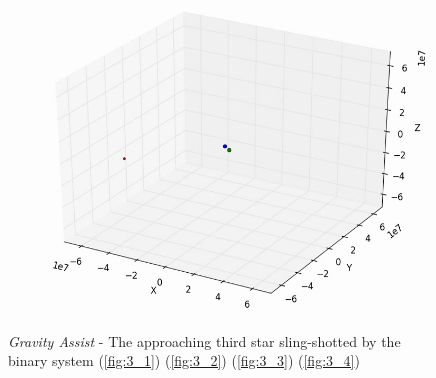 \documentclass[10pt,letterpaper]{article}
\begin{document}
\begin{figure}[!htb]
  \subcaption{}\label{fig:3_3}
\endminipage
{}
  \includegraphics[width=\linewidth]{figures/three_body/3_4.png}
  \subcaption{}\label{fig:3_4}
\endminipage
\caption{ \textit{Gravity Assist} - The approaching third star sling-shotted by the binary system
(\ref{fig:3_1}) 
(\ref{fig:3_2}) 
(\ref{fig:3_3}) 
(\ref{fig:3_4})}\label{fig:3}
\end{figure}
\end{document}
